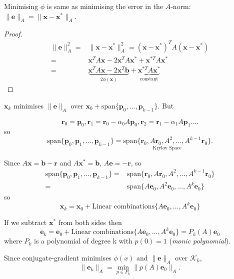 \documentclass[12pt, a4paper]{article}
\renewcommand{\vec}[1]{\mathbf{#1}}
\theoremstyle{definition}
\theoremstyle{remark}
\numberwithin{equation}{section}
\begin{document}
Minimising $\phi$ is same as minimising the error in the $A$-norm:\\$\|\vec{e}\|_A=\|\vec{x} -\vec{x}^*\|_A$.

\begin{proof}
\begin{align*}
\|\vec{e}\|^2_A =& \|\vec{x}-\vec{x}^*\|_A^2 = (\vec{x}-\vec{x}^*)^TA(\vec{x}-\vec{x}^*)\\
=& \vec{x}^TA\vec{x} - 2\vec{x}^TA\vec{x}^*+\vec{x}^{*T}A\vec{x}^*\\
=& \underbrace{\vec{x}^TA\vec{x} - 2\vec{x}^T\vec{b}}_{2\phi(\vec{x})} + \underbrace{\vec{x}^{*T}A\vec{x}^*}_{\mbox{constant}}
\end{align*}
\end{proof}

$\vec{x}_k$ minimises $\|\vec{e}\|_A$ over $\vec{x}_0 + \mbox{span}\{\vec{p}_0, \ldots, \vec{p}_{k-1}\}$. But

\begin{equation*}
\vec{r}_0=\vec{p}_0,\vec{r}_1=\vec{r}_0-\alpha_0 A \vec{p}_0,\vec{r}_2=\vec{r}_1 - \alpha_1 A\vec{p}_1. \ldots
\end{equation*}
so
\begin{equation*}
\mbox{span}\{\vec{p}_0,\vec{p}_1,\ldots,\vec{p}_{k-1}\} = \underset{\mbox{Krylov Space}}{\mbox{span} \{\vec{r}_0, A\vec{r}_0, A^2,\ldots,A^{k-1}\vec{r}_0\}}.
\end{equation*}

Since $A\vec{x}=\vec{b}-\vec{r}$ and $A\vec{x}^*=\vec{b}$, $A\vec{e}=-\vec{r}$, so
\begin{align*}
\mbox{span}\{\vec{p}_0,\vec{p}_1,\ldots,\vec{p}_{k-1}\} =& \mbox{span} \{\vec{r}_0, A\vec{r}_0, A^2,\ldots,A^{k-1}\vec{r}_0\}\\ =& \mbox{span}\{A\vec{e}_0,A^2\vec{e}_0,\ldots,A^k\vec{e}_0\}
\end{align*}
so 
\begin{equation*}
\vec{x}_k = \vec{x}_0 + \mbox{Linear combinations}\{A\vec{e}_0,\ldots,A^k\vec{e}_0\}
\end{equation*}

If we subtract $\vec{x}^*$ from both sides then
\begin{equation*}
\vec{e}_k=\vec{e}_0+\mbox{Linear combinations}\{A\vec{e}_0,\ldots,A^k\vec{e}_0\} = P_k(A)\vec{e}_0
\end{equation*}
where $P_k$ is a polynomial of degree k with $p(0)=1$ (\emph{monic polynomial}).

Since conjugate-gradient minimises $\phi(x)$ and $\|\vec{e}\|_A$ over $\mathcal{K}_k$, 
\begin{equation*}
\|\vec{e}_k\|_A = \min_{p \in P_k} \|p(A)\vec{e}_0\|_A.
\end{equation*}
\end{document}
